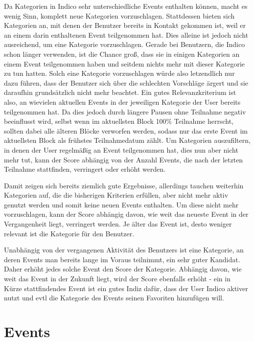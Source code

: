 Da Kategorien in Indico sehr unterschiedliche Events enthalten können, macht es wenig Sinn, komplett
neue Kategorien vorzuschlagen. Stattdessen bieten sich Kategorien an, mit denen der Benutzer bereits
in Kontakt gekommen ist, weil er an einem darin enthaltenen Event teilgenommen hat. Dies alleine ist
jedoch nicht ausreichend, um eine Kategorie vorzuschlagen. Gerade bei Benutzern, die Indico schon
länger verwenden, ist die Chance groß, dass sie in einigen Kategorien an einem Event teilgenommen
haben und seitdem nichts mehr mit dieser Kategorie zu tun hatten. Solch eine Kategorie vorzuschlagen
würde also letzendlich nur dazu führen, dass der Benutzer sich über die schlechten Vorschläge ärgert
und sie daraufhin grundsätzlich nicht mehr beachtet. Ein gutes Relevanzkriterium ist also, an
wievielen aktuellen Events in der jeweiligen Kategorie der User bereits teilgenommen hat. Da dies jedoch
durch längere Pausen ohne Teilnahme negativ beeinflusst wird, selbst wenn im aktuellsten Block 100\%
Teilnahme herrscht, sollten dabei alle älteren Blöcke verworfen werden, sodass nur das erste Event
im aktuellsten Block als frühstes Teilnahmedatum zählt. Um Kategorien auszufiltern, in denen der
User regelmäßig an Event teilgenommen hat, dies nun aber nicht mehr tut, kann der Score abhängig von
der Anzahl Events, die nach der letzten Teilnahme stattfinden, verringert oder erhöht werden.

Damit zeigen sich bereits ziemlich gute Ergebnisse, allerdings tauchen weiterhin Kategorien auf, die
die bisherigen Kriterien erfüllen, aber nicht mehr aktiv genutzt werden und somit keine neuen Events
enthalten. Um diese nicht mehr vorzuschlagen, kann der Score abhängig davon, wie weit das neueste
Event in der Vergangenheit liegt, verringert werden. Je älter das Event ist, desto weniger relevant
ist die Kategorie für den Benutzer.

Unabhängig von der vergangenen Aktivität des Benutzers ist eine Kategorie, an deren Events man
bereits lange im Voraus teilnimmt, ein sehr guter Kandidat. Daher erhöht jedes solche Event den
Score der Kategorie. Abhängig davon, wie weit das Event in der Zukunft liegt, wird der Score
ebenfalls erhöht - ein in Kürze stattfindendes Event ist ein gutes Indiz dafür, dass der User Indico
aktiver nutzt und evtl die Kategorie des Events seinen Favoriten hinzufügen will.


\section{Events}

